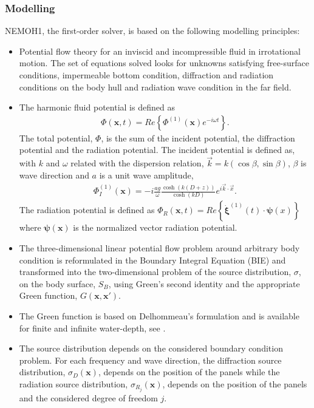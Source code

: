 \documentclass[12pt,a4paper,titlepage]{article}
\newcommand{\bs}{\boldsymbol}
\begin{document}
\subsubsection*{Modelling}
NEMOH1, the first-order solver, is based on the following modelling principles:
\begin{itemize}
\item Potential flow theory for an inviscid and incompressible fluid in irrotational motion. The set of equations solved looks for unknowns satisfying free-surface conditions, impermeable bottom condition, diffraction and radiation conditions on the body hull and radiation wave condition in the far field.
\item The harmonic fluid potential is defined as
\begin{align}\label{Eq:PhiHarm}
\Phi(\bs x,t)=Re\left\lbrace\Phi^{(1)}(\bs x)e^{-i\omega t}\right\rbrace.
\end{align}
The total potential, $\Phi$, is the sum of the incident potential, the diffraction potential and the radiation potential.
The incident potential is defined as, with $k$ and $\omega$ related with the dispersion relation, $\vec{k}=k(\cos \beta,\sin \beta)$, $\beta$ is wave direction and $a$ is a unit wave amplitude,
\begin{align}\label{Eq:PhiI}
\Phi_{I}^{(1)}(\bs x)=-i\frac{a g}{\omega}\frac{\cosh(k(D+z))}{\cosh(kD)} e^{i\vec{k}\cdot \vec{x}}.
\end{align}
The radiation potential is defined as $\Phi_R(\bs x,t)=Re\left\lbrace \dot{\bs \xi}^{(1)}(t) \cdot \bs \psi(x)\right\rbrace$ where $\bs \psi(\bs x)$ is the normalized vector radiation potential.

\item The three-dimensional linear potential flow problem around arbitrary body condition is reformulated in the Boundary Integral Equation (BIE) and transformed into the two-dimensional problem of the source distribution, $\sigma$, on the body surface, $S_B$, using Green's second identity and the appropriate Green function, $G(\bs x,\bs x')$.
\item The Green function is based on Delhommeau's formulation and is available for finite and infinite water-depth, see \cite{Delhommeau}.
\item The source distribution depends on the considered boundary condition problem. For each frequency and wave direction, the diffraction source distribution, $\sigma_D(\bs x)$, depends on the position of the panels while the radiation source distribution, $\sigma_{R_j}(\bs x)$,  depends on the position of the panels and the considered degree of freedom $j$.


\end{itemize}
\end{document}
